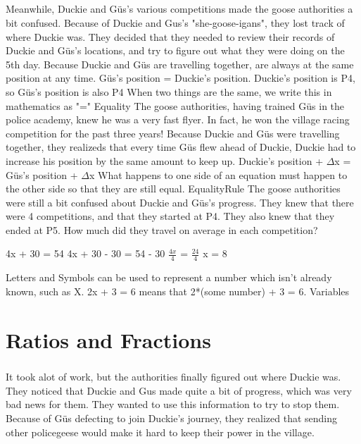 \documentclass[a4paper,11pt ]{book}
\begin{document}
\paragraph{} Meanwhile, Duckie and Güs's various competitions made the goose authorities a bit confused. Because of Duckie and Gus's "she-goose-igans", they lost track of where Duckie was. They decided that they needed to review their records of Duckie and Güs's locations, and try to figure out what they were doing on the 5th day. 
\vfill
\pagebreak
{Because Duckie and Güs are travelling together, are always at the same position at any time.}
{Güs's position = Duckie's position. Duckie's position is P4, so Güs's position is also P4}
{When two things are the same, we write this in mathematics as "="}
{Equality}
{The goose authorities, having trained Güs in the police academy, knew he was a very fast flyer. In fact, he won the village racing competition for the past three years! Because Duckie and Güs were travelling together, they realizeds that every time Güs flew ahead of Duckie, Duckie had to increase his position by the same amount to keep up.}
{Duckie's position + $\Delta$x = Güs's position + $\Delta$x}
{What happens to one side of an equation must happen to the other side so that they are still equal.}
{EqualityRule}
{The goose authorities were still a bit confused about Duckie and Güs's progress. They knew that there were 4 competitions, and that they started at P4. They also knew that they ended at P5. How much did they travel on average in each competition?}
{\begin{center} 4x + 30 = 54 \linebreak 4x + 30 - 30 = 54 - 30 \linebreak $\frac{4x}{4}$ = $\frac{24}{4}$ \linebreak x = $8$  \end{center}}
{Letters and Symbols can be used to represent a number which isn’t already known, such as X. 2x + 3 = 6 means that 2*(some number) + 3 = 6.}
{Variables}
\chapter{Ratios and Fractions}
\paragraph{} It took alot of work, but the authorities finally figured out where Duckie was. They noticed that Duckie and Gus made quite a bit of progress, which was very bad news for them. They wanted to use this information to try to stop them. Because of Güs defecting to join Duckie's journey, they realized that sending other policegeese would make it hard to keep their power in the village. 
\end{document}
